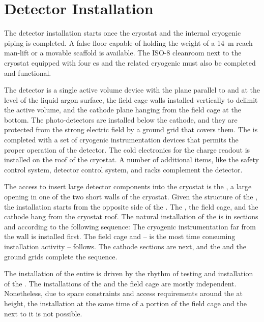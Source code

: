 \section{Detector Installation}
\label{ch:dp-tc-installation}

The detector installation starts once the cryostat and the internal cryogenic piping is completed.
A false floor capable of holding the weight of a 14~m reach man-lift or a movable scaffold is available.
The ISO-8 cleanroom next to the cryostat equipped with four  \coldbox{}es and the related cryogenic must also be completed and functional.

The  detector is a single active volume device with the  plane parallel to and at the level of the liquid argon surface, the field cage walls installed vertically to delimit the active volume, and the cathode plane hanging from the field cage at the bottom.
The photo-detectors are installed below the cathode, and they are protected from the strong electric field by a ground grid that covers them. 
The  is completed with a set of cryogenic instrumentation devices that permits the proper operation of the detector.
The cold electronics for the charge readout is installed on the roof of the cryostat.
A number of additional items, like the safety control system, detector control system, and  racks complement the detector.

The access to insert large detector components into the cryostat is the , a large opening in one of the two short walls of the cryostat.
Given the structure of the , the installation starts from the opposite side of the .
The , the field cage, and the cathode hang from the cryostat roof.
The natural installation of the  is in sections and according to the following sequence: The cryogenic instrumentation far from the  wall is installed first.
The field cage and  -- is the most time consuming installation activity -- follows. The cathode sections are next, and the  and the ground grids complete the sequence.

The installation of the entire  is driven by the rhythm of testing and installation of the .
The installations of the  and the field cage are mostly independent.
Nonetheless, due to space constraints and access requirements around the  at height, the installation at the same time of a portion of the field cage and the  next to it is not possible.

